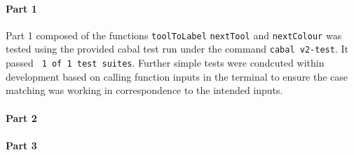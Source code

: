 \documentclass[11pt]{article}
\begin{document}
\paragraph{Part 1}
Part 1 composed of the functions \verb|toolToLabel| \verb|nextTool| and \verb|nextColour| was tested using the provided cabal test run under the command \verb|cabal v2-test|. It passed \verb| 1 of 1 test suites|. Further simple tests were condcuted within development based on calling function inputs in the terminal to ensure the case matching was working in correspondence to the intended inputs.
\paragraph{Part 2}
\paragraph{Part 3}



\end{document}
